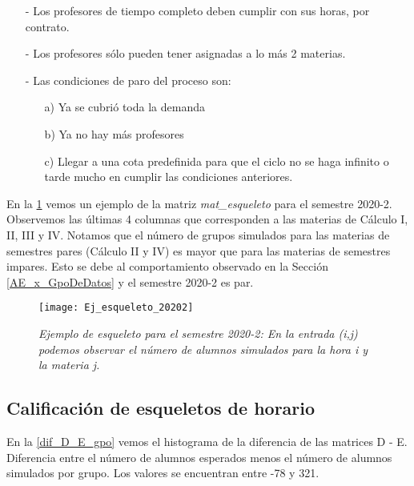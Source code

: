 \begin{itemize}

\item[-] Los profesores de tiempo completo deben cumplir con sus horas, por contrato.

\item[-] Los profesores sólo pueden tener asignadas a lo más 2 materias.

\item[-] Las condiciones de paro del proceso son:

\begin{itemize}
\item[a)] Ya se cubrió toda la demanda

\item[b)] Ya no hay más profesores

\item[c)] Llegar a una cota predefinida para que el ciclo no se haga infinito o tarde mucho en cumplir las condiciones anteriores.
\end{itemize}
\end{itemize}

En la \figurename{\ref{esqueleto20202}} vemos un ejemplo de la matriz \textit{mat\_esqueleto} para el semestre 2020-2. Observemos las últimas 4 columnas que corresponden a las materias de Cálculo I, II, III y IV. Notamos que el número de grupos simulados para las materias de semestres pares (Cálculo II y IV) es mayor que para las materias de semestres impares. Esto se debe al comportamiento observado en la Sección \ref{AE_x_GpoDeDatos} y el semestre 2020-2 es par.

\begin{figure}[H]
\centering
\texttt{[image: Ej\_esqueleto\_20202]} %
\caption[\textit{Ejemplo de esqueleto para el semestre 2020-2}]{\textit{Ejemplo de esqueleto para el semestre 2020-2: En la entrada (i,j) podemos observar el número de alumnos simulados para la hora i y la materia j.}}\label{esqueleto20202}
\end{figure}

\subsection{Calificación de esqueletos de horario}

En la \figurename{\ref{dif_D_E_gpo}} vemos el histograma de la diferencia de las matrices D - E. Diferencia entre el número de alumnos esperados menos el número de alumnos simulados por grupo. Los valores se encuentran entre -78 y 321.

